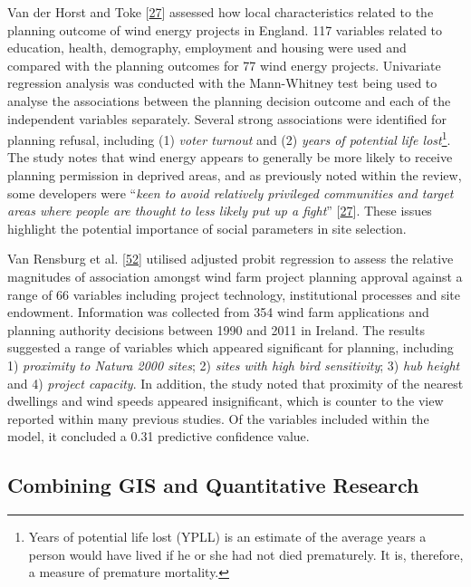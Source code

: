 \documentclass[a4paper,]{article}
\let\rmarkdownfootnote\footnote%
\def\footnote{\protect\rmarkdownfootnote}
\theoremstyle{definition}
\theoremstyle{definition}
\theoremstyle{definition}
\theoremstyle{remark}
\begin{document}
Van der Horst and Toke {[}\protect\hyperlink{ref-VanderHorst2010}{27}{]}
assessed how local characteristics related to the planning outcome of
wind energy projects in England. 117 variables related to education,
health, demography, employment and housing were used and compared with
the planning outcomes for 77 wind energy projects. Univariate regression
analysis was conducted with the Mann-Whitney test being used to analyse
the associations between the planning decision outcome and each of the
independent variables separately. Several strong associations were
identified for planning refusal, including (1) \emph{voter turnout} and
(2) \emph{years of potential life lost}\footnote{Years of potential life
  lost (YPLL) is an estimate of the average years a person would have
  lived if he or she had not died prematurely. It is, therefore, a
  measure of premature mortality.}. The study notes that wind energy
appears to generally be more likely to receive planning permission in
deprived areas, and as previously noted within the review, some
developers were ``\emph{keen to avoid relatively privileged communities
and target areas where people are thought to less likely put up a
fight}'' {[}\protect\hyperlink{ref-VanderHorst2010}{27}{]}. These issues
highlight the potential importance of social parameters in site
selection.

Van Rensburg et al. {[}\protect\hyperlink{ref-VanRensburg20}{52}{]}
utilised adjusted probit regression to assess the relative magnitudes of
association amongst wind farm project planning approval against a range
of 66 variables including project technology, institutional processes
and site endowment. Information was collected from 354 wind farm
applications and planning authority decisions between 1990 and 2011 in
Ireland. The results suggested a range of variables which appeared
significant for planning, including 1) \emph{proximity to Natura 2000
sites}; 2) \emph{sites with high bird sensitivity}; 3) \emph{hub height}
and 4) \emph{project capacity}. In addition, the study noted that
proximity of the nearest dwellings and wind speeds appeared
insignificant, which is counter to the view reported within many
previous studies. Of the variables included within the model, it
concluded a 0.31 predictive confidence value.

\subsection{Combining GIS and Quantitative
Research}\label{combining-gis-and-quantitative-research}
\end{document}
